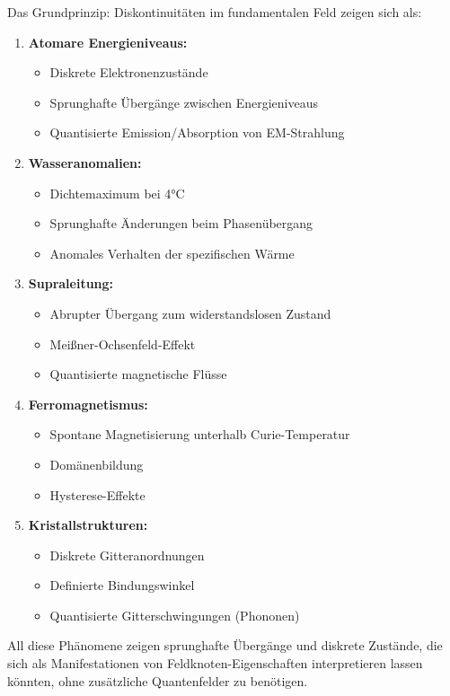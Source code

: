 \documentclass[12pt,a4paper]{article}
\begin{document}
	Das Grundprinzip: Diskontinuitäten im fundamentalen Feld zeigen sich als:
	
	\begin{enumerate}
		\item \textbf{Atomare Energieniveaus:}
		\begin{itemize}
			\item Diskrete Elektronenzustände
			\item Sprunghafte Übergänge zwischen Energieniveaus
			\item Quantisierte Emission/Absorption von EM-Strahlung
		\end{itemize}
		\item \textbf{Wasseranomalien:}
		\begin{itemize}
			\item Dichtemaximum bei 4°C
			\item Sprunghafte Änderungen beim Phasenübergang
			\item Anomales Verhalten der spezifischen Wärme
		\end{itemize}
		\item \textbf{Supraleitung:}
		\begin{itemize}
			\item Abrupter Übergang zum widerstandslosen Zustand
			\item Meißner-Ochsenfeld-Effekt
			\item Quantisierte magnetische Flüsse
		\end{itemize}
		\item \textbf{Ferromagnetismus:}
		\begin{itemize}
			\item Spontane Magnetisierung unterhalb Curie-Temperatur
			\item Domänenbildung
			\item Hysterese-Effekte
		\end{itemize}
		\item \textbf{Kristallstrukturen:}
		\begin{itemize}
			\item Diskrete Gitteranordnungen
			\item Definierte Bindungswinkel
			\item Quantisierte Gitterschwingungen (Phononen)
		\end{itemize}
	\end{enumerate}
	
	All diese Phänomene zeigen sprunghafte Übergänge und diskrete Zustände, die sich als Manifestationen von Feldknoten-Eigenschaften interpretieren lassen könnten, ohne zusätzliche Quantenfelder zu benötigen.
	
\end{document}
